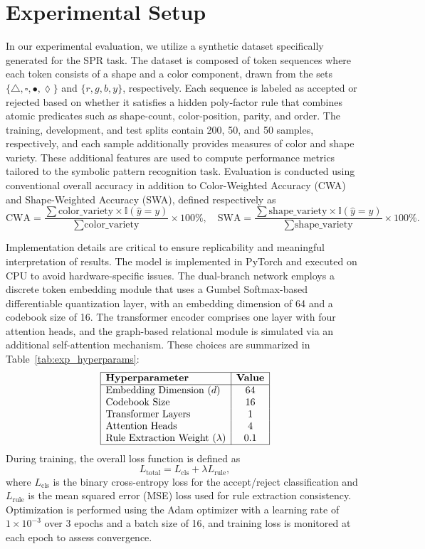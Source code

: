 \documentclass{article}
\begin{document}
\section{Experimental Setup}
In our experimental evaluation, we utilize a synthetic dataset specifically generated for the SPR task. The dataset is composed of token sequences where each token consists of a shape and a color component, drawn from the sets \(\{\triangle, \square, \bullet, \lozenge\}\) and \(\{r, g, b, y\}\), respectively. Each sequence is labeled as accepted or rejected based on whether it satisfies a hidden poly‑factor rule that combines atomic predicates such as shape-count, color-position, parity, and order. The training, development, and test splits contain 200, 50, and 50 samples, respectively, and each sample additionally provides measures of color and shape variety. These additional features are used to compute performance metrics tailored to the symbolic pattern recognition task. Evaluation is conducted using conventional overall accuracy in addition to Color-Weighted Accuracy (CWA) and Shape-Weighted Accuracy (SWA), defined respectively as
\[
\text{CWA} = \frac{\sum \text{color\_variety} \times \mathbb{I}(\hat{y}=y)}{\sum \text{color\_variety}} \times 100\%, \quad \text{SWA} = \frac{\sum \text{shape\_variety} \times \mathbb{I}(\hat{y}=y)}{\sum \text{shape\_variety}} \times 100\%.
\]

Implementation details are critical to ensure replicability and meaningful interpretation of results. The model is implemented in PyTorch and executed on CPU to avoid hardware-specific issues. The dual-branch network employs a discrete token embedding module that uses a Gumbel Softmax-based differentiable quantization layer, with an embedding dimension of 64 and a codebook size of 16. The transformer encoder comprises one layer with four attention heads, and the graph-based relational module is simulated via an additional self-attention mechanism. These choices are summarized in Table~\ref{tab:exp_hyperparams}:
\[
\begin{array}{|l|c|}
\hline
\textbf{Hyperparameter} & \textbf{Value} \\
\hline
\text{Embedding Dimension} \ (d) & 64 \\
\text{Codebook Size} & 16 \\
\text{Transformer Layers} & 1 \\
\text{Attention Heads} & 4 \\
\text{Rule Extraction Weight} \ (\lambda) & 0.1 \\
\hline
\end{array}
\]
During training, the overall loss function is defined as
\[
L_{\text{total}} = L_{\text{cls}} + \lambda L_{\text{rule}},
\]
where \(L_{\text{cls}}\) is the binary cross-entropy loss for the accept/reject classification and \(L_{\text{rule}}\) is the mean squared error (MSE) loss used for rule extraction consistency. Optimization is performed using the Adam optimizer with a learning rate of \(1 \times 10^{-3}\) over 3 epochs and a batch size of 16, and training loss is monitored at each epoch to assess convergence.
\end{document}
